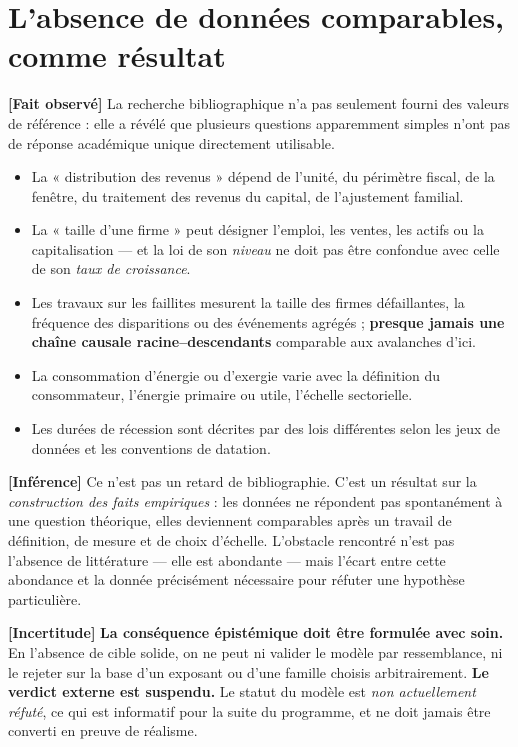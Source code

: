 \documentclass[11pt,a4paper]{article}
\newcommand{\fait}{\textbf{[Fait observé]}}
\newcommand{\inference}{\textbf{[Inférence]}}
\newcommand{\incertitude}{\textbf{[Incertitude]}}
\begin{document}
\section{L'absence de données comparables, comme résultat}
\label{sec:absence}

\fait{} La recherche bibliographique n'a pas seulement fourni des valeurs de
référence : elle a révélé que plusieurs questions apparemment simples n'ont pas
de réponse académique unique directement utilisable.

\begin{itemize}
\item La « distribution des revenus » dépend de l'unité, du périmètre fiscal,
      de la fenêtre, du traitement des revenus du capital, de l'ajustement
      familial.
\item La « taille d'une firme » peut désigner l'emploi, les ventes, les actifs
      ou la capitalisation --- et la loi de son \emph{niveau} ne doit pas être
      confondue avec celle de son \emph{taux de croissance}.
\item Les travaux sur les faillites mesurent la taille des firmes défaillantes,
      la fréquence des disparitions ou des événements agrégés ; \textbf{presque
      jamais une chaîne causale racine--descendants} comparable aux avalanches
      d'ici.
\item La consommation d'énergie ou d'exergie varie avec la définition du
      consommateur, l'énergie primaire ou utile, l'échelle sectorielle.
\item Les durées de récession sont décrites par des lois différentes selon les
      jeux de données et les conventions de datation.
\end{itemize}

\inference{} Ce n'est pas un retard de bibliographie. C'est un résultat sur la
\emph{construction des faits empiriques} : les données ne répondent pas
spontanément à une question théorique, elles deviennent comparables après un
travail de définition, de mesure et de choix d'échelle. L'obstacle rencontré
n'est pas l'absence de littérature --- elle est abondante --- mais l'écart
entre cette abondance et la donnée précisément nécessaire pour réfuter une
hypothèse particulière.

\incertitude{} \textbf{La conséquence épistémique doit être formulée avec
soin.} En l'absence de cible solide, on ne peut ni valider le modèle par
ressemblance, ni le rejeter sur la base d'un exposant ou d'une famille choisis
arbitrairement. \textbf{Le verdict externe est suspendu.} Le statut du modèle
est \emph{non actuellement réfuté}, ce qui est informatif pour la suite du
programme, et ne doit jamais être converti en preuve de réalisme.
\end{document}
